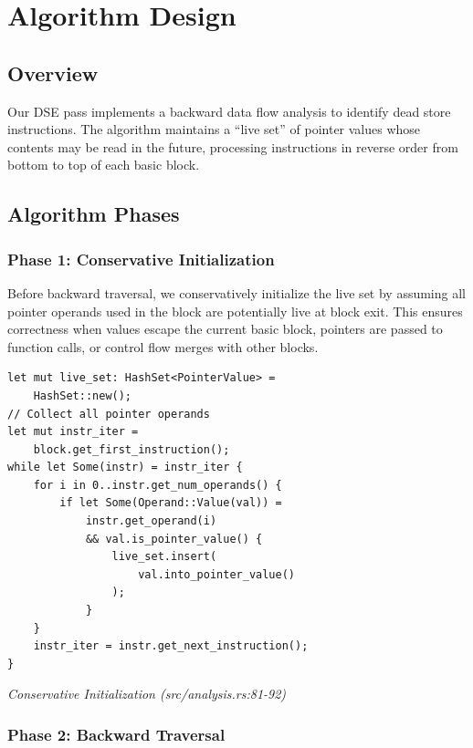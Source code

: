 \documentclass[journal]{IEEEtran}
\begin{document}
\section{Algorithm Design}

\subsection{Overview}

Our DSE pass implements a backward data flow analysis to identify dead store instructions. The algorithm maintains a ``live set'' of pointer values whose contents may be read in the future, processing instructions in reverse order from bottom to top of each basic block.

\subsection{Algorithm Phases}

\subsubsection{Phase 1: Conservative Initialization}

Before backward traversal, we conservatively initialize the live set by assuming all pointer operands used in the block are potentially live at block exit. This ensures correctness when values escape the current basic block, pointers are passed to function calls, or control flow merges with other blocks.

\begin{verbatim}
let mut live_set: HashSet<PointerValue> = 
    HashSet::new();
// Collect all pointer operands
let mut instr_iter = 
    block.get_first_instruction();
while let Some(instr) = instr_iter {
    for i in 0..instr.get_num_operands() {
        if let Some(Operand::Value(val)) = 
            instr.get_operand(i)
            && val.is_pointer_value() {
                live_set.insert(
                    val.into_pointer_value()
                );
            }
    }
    instr_iter = instr.get_next_instruction();
}
\end{verbatim}
\begin{center}
\textit{Conservative Initialization (src/analysis.rs:81-92)}
\end{center}

\subsubsection{Phase 2: Backward Traversal}
\end{document}
